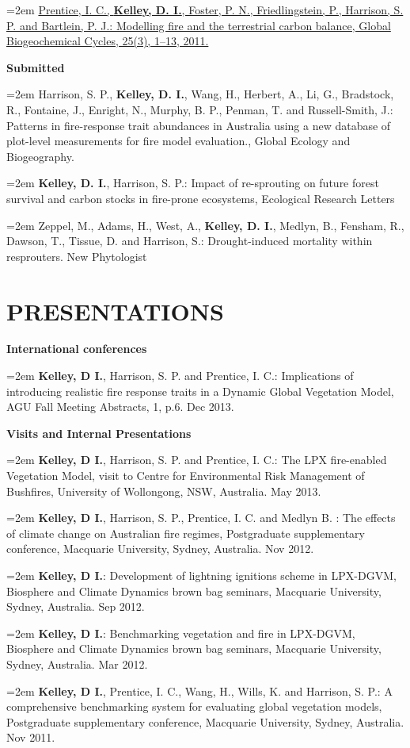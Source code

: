 \documentclass[paper=a4,fontsize=11pt]{scrartcl}	 			%
\newcommand{\sepspace}{\vspace*{1em}}			%
\newcommand{\NewPart}[1]{\section*{\uppercase{#1}}}
\newcommand{\BibEntry}[2]{
		\noindent \textbf{#1} \hfill \par					%
		\noindent\hangindent=2em\hangafter=0 \small #2 	%
		\normalsize \par}
\begin{document}
\BibEntry{} {\href{http://onlinelibrary.wiley.com/doi/10.1029/2010GB003906/abstract}{Prentice, I. C., \textbf{Kelley, D. I.}, Foster, P. N., Friedlingstein, P., Harrison, S. P. and Bartlein, P. J.: Modelling fire and the terrestrial carbon balance, Global Biogeochemical Cycles, 25(3), 1--13, 2011.}}
\sepspace

\BibEntry{Submitted} {Harrison, S. P., \textbf{Kelley, D. I.}, Wang, H., Herbert, A., Li, G., Bradstock, R., Fontaine, J., Enright, N., Murphy, B. P., Penman, T. and Russell-Smith, J.: Patterns in fire-response trait abundances in Australia using a new database of plot-level measurements for fire model evaluation., Global Ecology and Biogeography.}

\BibEntry{} {\textbf{Kelley, D. I.}, Harrison, S. P.: Impact of re-sprouting on future forest survival and carbon stocks in fire-prone ecosystems, Ecological Research Letters}

\BibEntry{} {Zeppel, M., Adams, H., West, A., \textbf{Kelley, D. I.}, Medlyn, B., Fensham, R., Dawson, T., Tissue, D. and Harrison, S.: Drought-induced mortality within resprouters. New Phytologist }


\NewPart{Presentations}
\BibEntry{International conferences} {\textbf{Kelley, D I.}, Harrison, S. P. and Prentice, I. C.: Implications of introducing realistic fire response traits in a Dynamic Global Vegetation Model, AGU Fall Meeting Abstracts, 1,  p.6. Dec 2013.}
\sepspace

\BibEntry{Visits and Internal Presentations} {\textbf{Kelley, D I.}, Harrison, S. P. and Prentice, I. C.: The LPX fire-enabled Vegetation Model, visit to Centre for Environmental Risk Management of Bushfires, University of Wollongong, NSW, Australia. May 2013.}

\BibEntry{} {\textbf{Kelley, D I.}, Harrison, S. P., Prentice, I. C. and Medlyn B. : The effects of climate change on Australian fire regimes, Postgraduate supplementary conference, Macquarie University, Sydney, Australia. Nov 2012.}

\BibEntry{} {\textbf{Kelley, D I.}: Development of lightning ignitions scheme in LPX-DGVM, Biosphere and Climate Dynamics brown bag seminars, Macquarie University, Sydney, Australia. Sep 2012.}

\BibEntry{} {\textbf{Kelley, D I.}: Benchmarking vegetation and fire in LPX-DGVM, Biosphere and Climate Dynamics brown bag seminars, Macquarie University, Sydney, Australia. Mar 2012.}

\BibEntry{} {\textbf{Kelley, D I.}, Prentice, I. C., Wang, H., Wills, K. and Harrison, S. P.: A comprehensive benchmarking system for evaluating global vegetation models, Postgraduate supplementary conference, Macquarie University, Sydney, Australia. Nov 2011.}
\end{document}
